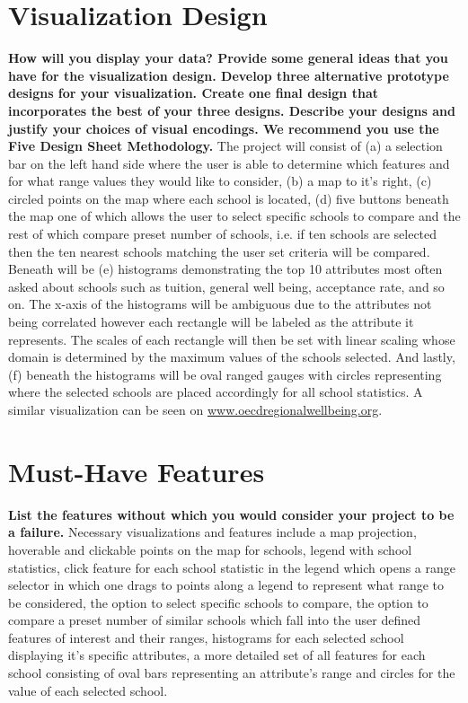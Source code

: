 \documentclass[11pt, a4paper]{article}
\begin{document}
  \section{Visualization Design}\textbf{ How will you display your data? Provide some general ideas that you have for the visualization design. Develop three alternative prototype designs for your visualization. Create one final design that incorporates the best of your three designs. Describe your designs and justify your choices of visual encodings. We recommend you use the Five Design Sheet Methodology.}
  The project will consist of (a) a selection bar on the left hand side where the user is able to determine which features and for what range values they would like to consider, (b) a map to it's right, (c) circled points on the map where each school is located, (d) five buttons beneath the map one of which allows the user to select specific schools to compare and the rest of which compare preset number of schools, i.e. if ten schools are selected then the ten nearest schools matching the user set criteria will be compared. Beneath will be (e) histograms demonstrating the top 10 attributes most often asked about schools such as tuition, general well being, acceptance rate, and so on. The x-axis of the histograms will be ambiguous due to the attributes not being correlated however each rectangle will be labeled as the attribute it represents. The scales of each rectangle will then be set with linear scaling whose domain is determined by the maximum values of the schools selected. And lastly, (f) beneath the histograms will be oval ranged gauges with circles representing where the selected schools are placed accordingly for all school statistics. A similar visualization can be seen on \href{https://www.oecdregionalwellbeing.org}{www.oecdregionalwellbeing.org}. 
 
  
\begin{figure}[H]
\label{visualization sketch}
\end{figure}
  \section{Must-Have Features}\textbf{ List the features without which you would consider your project to be a failure.}
  Necessary visualizations and features include a map projection, hoverable and clickable points on the map for schools, legend with school statistics, click feature for each school statistic in the legend which opens a range selector in which one drags to points along a legend to represent what range to be considered, the option to select specific schools to compare, the option to compare a preset number of similar schools which fall into the user defined features of interest and their ranges, histograms for each selected school displaying it's specific attributes, a more detailed set of all features for each school consisting of oval bars representing an attribute's range and circles for the value of each selected school.
\end{document}
